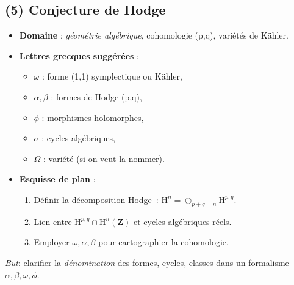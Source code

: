 \documentclass[12pt]{article}
\begin{document}
\subsection{(5) Conjecture de Hodge}
\begin{itemize}
    \item \textbf{Domaine} : \emph{géométrie algébrique}, cohomologie (p,q), variétés de Kähler.
    \item \textbf{Lettres grecques suggérées} :
    \begin{itemize}
        \item \(\omega\) : forme (1,1) symplectique ou Kähler,
        \item \(\alpha,\beta\) : formes de Hodge (p,q),
        \item \(\phi\) : morphismes holomorphes,
        \item \(\sigma\) : cycles algébriques, 
        \item \(\Omega\) : variété (si on veut la nommer).
    \end{itemize}
    \item \textbf{Esquisse de plan} :
    \begin{enumerate}
        \item Définir la décomposition Hodge~: $\mathrm{H}^n = \oplus_{p+q=n} \mathrm{H}^{p,q}$.
        \item Lien entre \(\mathrm{H}^{p,q}\cap \mathrm{H}^n(\mathbf{Z})\) et cycles algébriques réels.
        \item Employer $\omega,\alpha,\beta$ pour cartographier la cohomologie.
    \end{enumerate}
\end{itemize}
\emph{But}: clarifier la \emph{dénomination} des formes, cycles, classes 
dans un formalisme $\alpha,\beta,\omega,\phi$.
\end{document}
